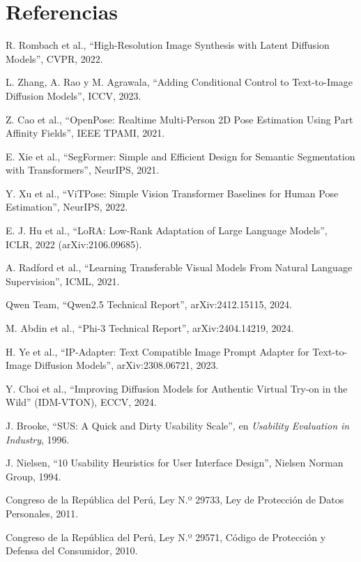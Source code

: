 \documentclass[11pt,letterpaper]{article}
\begin{document}
\section*{Referencias}
\footnotesize
\begin{enumerate}[label={[\arabic*]},leftmargin=2.2em,itemsep=0pt]
\item R. Rombach et al., ``High-Resolution Image Synthesis with Latent Diffusion Models'', CVPR, 2022.
\item L. Zhang, A. Rao y M. Agrawala, ``Adding Conditional Control to Text-to-Image Diffusion Models'', ICCV, 2023.
\item Z. Cao et al., ``OpenPose: Realtime Multi-Person 2D Pose Estimation Using Part Affinity Fields'', IEEE TPAMI, 2021.
\item E. Xie et al., ``SegFormer: Simple and Efficient Design for Semantic Segmentation with Transformers'', NeurIPS, 2021.
\item Y. Xu et al., ``ViTPose: Simple Vision Transformer Baselines for Human Pose Estimation'', NeurIPS, 2022.
\item E. J. Hu et al., ``LoRA: Low-Rank Adaptation of Large Language Models'', ICLR, 2022 (arXiv:2106.09685).
\item A. Radford et al., ``Learning Transferable Visual Models From Natural Language Supervision'', ICML, 2021.
\item Qwen Team, ``Qwen2.5 Technical Report'', arXiv:2412.15115, 2024.
\item M. Abdin et al., ``Phi-3 Technical Report'', arXiv:2404.14219, 2024.
\item H. Ye et al., ``IP-Adapter: Text Compatible Image Prompt Adapter for Text-to-Image Diffusion Models'', arXiv:2308.06721, 2023.
\item Y. Choi et al., ``Improving Diffusion Models for Authentic Virtual Try-on in the Wild'' (IDM-VTON), ECCV, 2024.
\item J. Brooke, ``SUS: A Quick and Dirty Usability Scale'', en \emph{Usability Evaluation in Industry}, 1996.
\item J. Nielsen, ``10 Usability Heuristics for User Interface Design'', Nielsen Norman Group, 1994.
\item Congreso de la República del Perú, Ley N.º 29733, Ley de Protección de Datos Personales, 2011.
\item Congreso de la República del Perú, Ley N.º 29571, Código de Protección y Defensa del Consumidor, 2010.
\end{enumerate}
\normalsize
\end{document}

